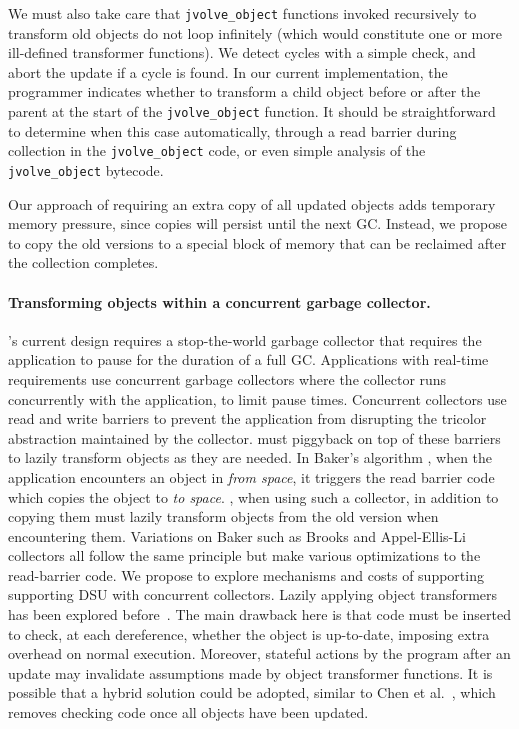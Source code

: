 We must also take care that \texttt{jvolve\_object} functions invoked
recursively to transform old objects do not loop infinitely (which would
constitute one or more ill-defined transformer functions). We detect
cycles with a simple check, and abort the update if a cycle is found.
In our current implementation, the programmer indicates whether to
transform a child object before or after the parent at the start of
the \texttt{jvolve\_object} function.  It should be straightforward to
determine when this case automatically, through a read barrier during
collection in the \texttt{jvolve\_object} code, or even simple
analysis of the \texttt{jvolve\_object} bytecode.

Our approach of requiring an extra copy of all updated objects adds
temporary memory pressure, since copies will persist until the next GC\@.
Instead, we propose to copy the old versions to a special block of memory
that can be reclaimed after the collection completes.

\paragraph{Transforming objects within a concurrent garbage collector.}
\DSU{}'s current design requires a stop-the-world garbage collector that
requires the application to pause for the duration of a full GC\@.
Applications with real-time requirements use concurrent garbage collectors
where the collector runs concurrently with the application, to limit pause
times. Concurrent
collectors use read and write barriers to prevent the application from
disrupting the tricolor abstraction maintained by the collector. \DSU{}
must piggyback on top of these barriers to lazily transform objects as
they are needed. In Baker's algorithm \cite{Baker:1978}, when the
application encounters an object in \emph{from space}, it triggers the read
barrier code which copies the object to \emph{to space}. \DSU{}, when using
such a collector, in addition to copying them must lazily transform objects
from the old version when encountering them. Variations on Baker such as
Brooks \cite{Brooks:1984} and Appel-Ellis-Li collectors \cite{Appel:1988} all follow the same
principle but make various optimizations to the read-barrier code. We
propose to explore mechanisms and costs of supporting supporting DSU with
concurrent collectors.
Lazily applying object transformers has been explored
before~\cite{ritzau00dynamic,Mala00a,neamtiu06dsu,chen:icse07}.  The
main drawback here is that code must be inserted to check, at each
dereference, whether the object is up-to-date, imposing extra overhead
on normal execution.  Moreover, stateful actions by the program after
an update may invalidate assumptions made by object transformer
functions.  It is possible that a hybrid solution could be adopted,
similar to Chen et al.~\cite{chen:icse07}, which removes checking
code once all objects have been updated.

